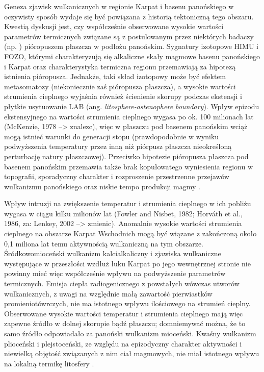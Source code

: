 \documentclass[11.5pt,twoside]{report}
\begin{document}
 Geneza zjawisk wulkanicznych w regionie Karpat i basenu panońskiego w oczywisty sposób wydaje się być powiązana z historią tektoniczną tego obszaru. Kwestią dyskusji jest, czy współcześnie obserwowane wysokie wartości parametrów termicznych związane są z postulowanym przez niektórych badaczy (np. \cite{Wilson.2001}) pióropuszem płaszcza w podłożu panońskim. Sygnatury izotopowe HIMU i FOZO, którymi charakteryzują się alkaliczne skały magmowe basenu panońskiego i Karpat oraz charakterystyka termiczna regionu przemawiają za hipotezą istnienia pióropusza. Jednakże, taki skład izotopowy może być efektem metasomatozy (niekoniecznie zaś pióropusza płaszcza), a wysokie wartości strumienia cieplnego wyjaśnia również ścienienie skorupy podczas ekstensji i płytkie usytuowanie LAB (ang. \textit{litosphere-astenophere boundary}). Wpływ epizodu ekstensyjnego na wartości strumienia cieplnego wygasa po ok. 100 milionach lat (McKenzie, 1978 --> znalezc), więc w płaszczu pod basenem panońskim wciąż mogą istnieć warunki do generacji stopu (prawdopodobnie w wyniku podwyższenia temperatury przez inną niż piórpusz płaszcza nieokreśloną perturbację natury płaszczowej). Przeciwko hipotezie pióropusza płaszcza pod basenem panońskim przemawia także brak kopułowatego wyniesienia regionu w topografii, sporadyczny charakter i rozproszenie przestrzenne przejawów wulkanizmu panońskiego oraz niskie tempo produkcji magmy \parencite{Harangi.2007}.    
 
 Wpływ intruzji na zwiększenie temperatur i strumienia cieplnego w ich pobliżu wygasa w ciągu kilku milionów lat (Fowler and Nisbet, 1982; Horv\'{a}th et al., 1986, za: Lenkey, 2002 --> zmienic). Anomalnie wysokie wartości strumienia cieplnego na obszarze Karpat Wschodnich mogą być wiązane z zakończoną około 0,1 miliona lat temu aktywnością wulkaniczną na tym obszarze. Śródkowomioceński wulkanizm kalcialkaliczny i zjawiska wulkaniczne występujące w przeszłości wzdłuż łuku Karpat po jego wewnętrznej stronie nie powinny mieć więc współcześnie wpływu na podwyższenie parametrów termicznych. Emisja ciepła radiogenicznego z powstałych wówczas utworów wulkanicznych, z uwagi na względnie małą zawartość pierwiastków promieniotówrczych, nie ma istotnego wpływu ilościowego na strumień cieplny. Obserwowane wysokie wartości temperatur i strumienia cieplnego mają więc zapewne \'{z}ródło w dolnej skorupie bąd\'{z} płaszczu; domniemywać można, że to samo \'{z}ródło odpowiadało za panoński wulkanizm mioceński. Kwaśny wulkanizm plioceński i plejstoceński, ze względu na epizodyczny charakter aktywności i niewielką objętość związanych z nim ciał magmowych, nie miał istotnego wpływu na lokalną termikę litosfery \parencite{Lenkey.2002}.
 
\end{document}
